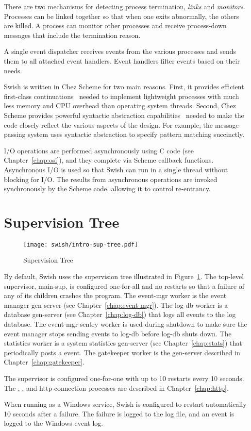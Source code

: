 There are two mechanisms for detecting process termination,
\emph{links} and \emph{monitors}. Processes can be linked together so
that when one exits abnormally, the others are killed. A process can
monitor other processes and receive process-down messages that include
the termination reason.

A single event dispatcher receives events from the various processes
and sends them to all attached event handlers.  Event handlers filter
events based on their needs.

Swish is written in Chez Scheme
for two main reasons. First, it provides efficient first-class
continuations~\cite{one-shot,representing-control} needed to implement
lightweight processes with much less memory and CPU overhead than
operating system threads.  Second, Chez Scheme provides powerful
syntactic abstraction capabilities~\cite{syntactic-abstraction} needed
to make the code closely reflect the various aspects of the
design. For example, the message-passing system uses syntactic
abstraction to specify pattern matching succinctly.

I/O operations are performed asynchronously using C code (see
Chapter~\ref{chap:osi}), and they complete via Scheme callback
functions. Asynchronous I/O is used so that Swish can run in a single
thread without blocking for I/O. The results from asynchronous
operations are invoked synchronously by the Scheme code, allowing it
to control re-entrancy.

\section {Supervision Tree}

\begin{figure}
  \center\texttt{[image: swish/intro-sup-tree.pdf]}
  \caption{\label{fig:intro-sup-tree}Supervision Tree}
\end{figure}

By default, Swish uses the supervision tree illustrated in
Figure~\ref{fig:intro-sup-tree}. The top-level supervisor, main-sup,
is configured one-for-all and no restarts so that a failure of any of
its children crashes the program. The event-mgr worker is the event
manager gen-server (see Chapter~\ref{chap:event-mgr}). The log-db
worker is a database gen-server (see Chapter~\ref{chap:log-db}) that
logs all events to the log database. The event-mgr-sentry worker is
used during shutdown to make sure the event manager stops sending
events to log-db before log-db shuts down. The statistics worker is a
system statistics gen-server (see Chapter~\ref{chap:stats}) that
periodically posts a  event.  The gatekeeper
worker is the gen-server described in Chapter~\ref{chap:gatekeeper}.

The  supervisor is configured one-for-one with up to
10 restarts every 10 seconds. The ,
, and http-connection processes are described in
Chapter~\ref{chap:http}.

When running as a Windows service, Swish is configured to restart
automatically 10 seconds after a failure. The failure is logged to the
log file, and an event is logged to the Windows event log.

